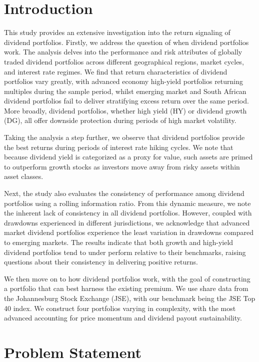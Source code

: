 \documentclass[12pt,preprint, authoryear]{elsarticle}
\numberwithin{equation}{section}
\numberwithin{figure}{section}
\numberwithin{table}{section}
\begin{document}
\hypertarget{introduction}{%
\section{Introduction}\label{introduction}}

This study provides an extensive investigation into the return signaling
of dividend portfolios. Firstly, we address the question of when
dividend portfolios work. The analysis delves into the performance and
risk attributes of globally traded dividend portfolios across different
geographical regions, market cycles, and interest rate regimes. We find
that return characteristics of dividend portfolios vary greatly, with
advanced economy high-yield portfolios returning multiples during the
sample period, whilst emerging market and South African dividend
portfolios fail to deliver stratifying excess return over the same
period. More broadly, dividend portfolios, whether high yield (HY) or
dividend growth (DG), all offer downside protection during periods of
high market volatility.

Taking the analysis a step further, we observe that dividend portfolios
provide the best returns during periods of interest rate hiking cycles.
We note that because dividend yield is categorized as a proxy for value,
such assets are primed to outperform growth stocks as investors move
away from risky assets within asset classes.

Next, the study also evaluates the consistency of performance among
dividend portfolios using a rolling information ratio. From this dynamic
measure, we note the inherent lack of consistency in all dividend
portfolios. However, coupled with drawdowns experienced in different
jurisdictions, we acknowledge that advanced market dividend portfolios
experience the least variation in drawdowns compared to emerging
markets. The results indicate that both growth and high-yield dividend
portfolios tend to under perform relative to their benchmarks, raising
questions about their consistency in delivering positive returns.

We then move on to how dividend portfolios work, with the goal of
constructing a portfolio that can best harness the existing premium. We
use share data from the Johannesburg Stock Exchange (JSE), with our
benchmark being the JSE Top 40 index. We construct four portfolios
varying in complexity, with the most advanced accounting for price
momentum and dividend payout sustainability.

\hypertarget{problem-statement}{%
\section{Problem Statement}\label{problem-statement}}
\end{document}
